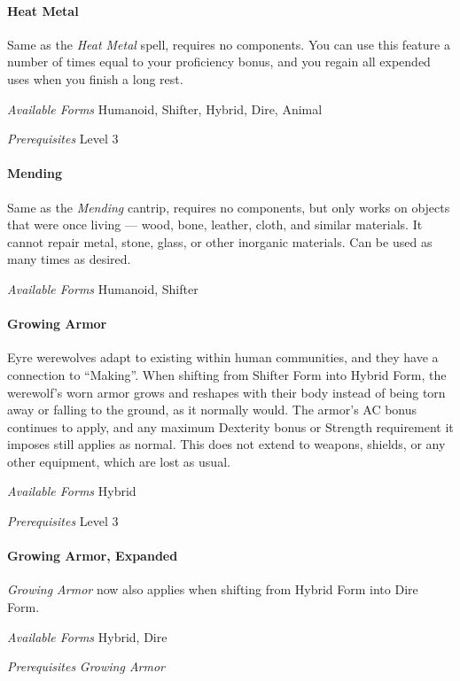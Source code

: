 \documentclass[twocolumn]{dndbook}
\begin{document}
\paragraph*{Heat Metal}
Same as the \emph{Heat Metal} spell, requires no components.
You can use this feature a number of times equal to your proficiency bonus, and you regain all expended uses when you finish a long rest.\par
\emph{Available Forms} Humanoid, Shifter, Hybrid, Dire, Animal\par
\emph{Prerequisites} Level 3\par

\paragraph*{Mending}
Same as the \emph{Mending} cantrip, requires no components, but only works on objects that were once living --- wood, bone, leather, cloth, and similar materials.
It cannot repair metal, stone, glass, or other inorganic materials.
Can be used as many times as desired.\par
\emph{Available Forms} Humanoid, Shifter\par

\paragraph*{Growing Armor}
Eyre werewolves adapt to existing within human communities, and they have a connection to ``Making''.
When shifting from Shifter Form into Hybrid Form, the werewolf's worn armor grows and reshapes with their body instead of being torn away or falling to the ground, as it normally would.
The armor's AC bonus continues to apply, and any maximum Dexterity bonus or Strength requirement it imposes still applies as normal.
This does not extend to weapons, shields, or any other equipment, which are lost as usual.\par
\emph{Available Forms} Hybrid\par
\emph{Prerequisites} Level 3\par

\paragraph*{Growing Armor, Expanded}
\emph{Growing Armor} now also applies when shifting from Hybrid Form into Dire Form.\par
\emph{Available Forms} Hybrid, Dire\par
\emph{Prerequisites} \emph{Growing Armor}\par
\end{document}
